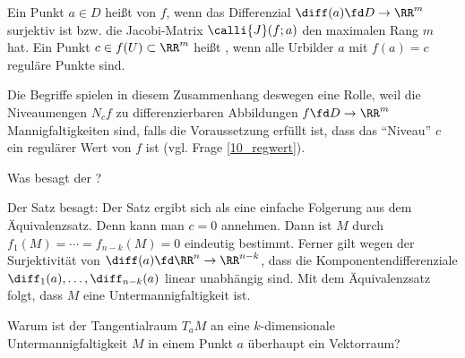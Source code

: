 \begin{antwort}
  Ein Punkt $a \in D$ heißt  von $f$, wenn 
  das Differenzial $\diff (a)\fd D\to \RR^m$ surjektiv ist bzw. 
  die Jacobi-Matrix $\calli{J}(f;a)$ den maximalen Rang $m$ hat.  
  Ein Punkt $c \in f(U) \subset \RR^m$ heißt , 
  wenn alle Urbilder $a$ mit $f(a)=c$ reguläre Punkte sind.

  Die Begriffe spielen in diesem Zusammenhang deswegen eine 
  Rolle, weil die Niveaumengen $N_cf$ zu 
  differenzierbaren Abbildungen $f \fd D\to \RR^m$
  Mannigfaltigkeiten sind, falls die Voraussetzung erfüllt ist, 
  dass das "`Niveau"' $c$ ein regulärer Wert von $f$ ist 
  (vgl. Frage \ref{10_regwert}). 
  \AntEnd 
\end{antwort}

\begin{frage}\label{10_regwert}
  Was besagt der ?
\end{frage}

\begin{antwort}
  Der Satz besagt: 
  \noindent 
  Der Satz ergibt sich als eine einfache Folgerung aus dem Äquivalenzsatz. 
  Denn {\oBdA} kann man $c=0$ annehmen. Dann 
  ist $M$ durch  $f_1( M )=\cdots = 
  f_{n-k}( M )=0$ eindeutig bestimmt. Ferner gilt 
  wegen der Surjektivität von 
  $\diff (a) \fd \RR^n \to \RR^{n-k}$, 
  dass die Komponentendifferenziale 
  $\diff_1(a),\ldots, \diff_{n-k}(a)$ linear unabhängig 
  sind. 
  Mit dem Äquivalenzsatz folgt, 
  dass $M$ eine Untermannigfaltigkeit ist.
  \AntEnd
\end{antwort}

\begin{frage}\label{10_tangraum}
  Warum ist der Tangentialraum $T_aM$ an eine $k$-dimensionale 
  Untermannigfaltigkeit $M$ in einem Punkt $a$ überhaupt 
  ein Vektorraum? 
\end{frage}

